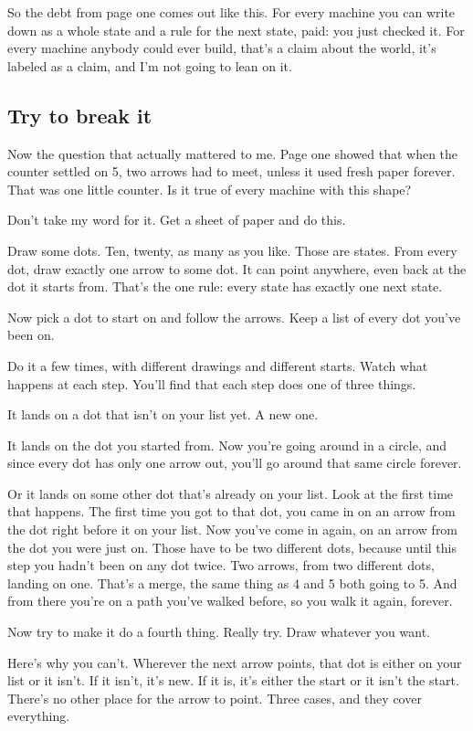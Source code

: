 \documentclass[11pt,twoside]{article}
\theoremstyle{thielethm}
\theoremstyle{thieledef}
\theoremstyle{thieledef}
\theoremstyle{thieledef}
\theoremstyle{thielethm}
\theoremstyle{thieleobs}
\theoremstyle{thielethm}
\begin{document}
So the debt from page one comes out like this. For every machine you can write down as a whole state and a rule for the next state, paid: you just checked it. For every machine anybody could ever build, that's a claim about the world, it's labeled as a claim, and I'm not going to lean on it.

\subsection{Try to break it}

Now the question that actually mattered to me. Page one showed that when the counter settled on 5, two arrows had to meet, unless it used fresh paper forever. That was one little counter. Is it true of every machine with this shape?

Don't take my word for it. Get a sheet of paper and do this.

Draw some dots. Ten, twenty, as many as you like. Those are states. From every dot, draw exactly one arrow to some dot. It can point anywhere, even back at the dot it starts from. That's the one rule: every state has exactly one next state.

Now pick a dot to start on and follow the arrows. Keep a list of every dot you've been on.

Do it a few times, with different drawings and different starts. Watch what happens at each step. You'll find that each step does one of three things.

It lands on a dot that isn't on your list yet. A new one.

It lands on the dot you started from. Now you're going around in a circle, and since every dot has only one arrow out, you'll go around that same circle forever.

Or it lands on some other dot that's already on your list. Look at the first time that happens. The first time you got to that dot, you came in on an arrow from the dot right before it on your list. Now you've come in again, on an arrow from the dot you were just on. Those have to be two different dots, because until this step you hadn't been on any dot twice. Two arrows, from two different dots, landing on one. That's a merge, the same thing as 4 and 5 both going to 5. And from there you're on a path you've walked before, so you walk it again, forever.

Now try to make it do a fourth thing. Really try. Draw whatever you want.

Here's why you can't. Wherever the next arrow points, that dot is either on your list or it isn't. If it isn't, it's new. If it is, it's either the start or it isn't the start. There's no other place for the arrow to point. Three cases, and they cover everything.
\end{document}
